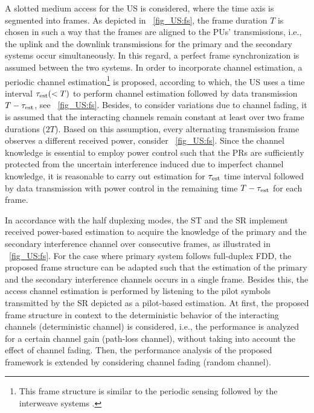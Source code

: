 A slotted medium access for the US is considered, where the time axis is segmented into frames. As depicted in \figurename~\ref{fig_US:fs}, the frame duration $T$ is chosen in such a way that the frames are aligned to the PUs' transmissions, i.e., the uplink and the downlink transmissions for the primary and the secondary systems occur simultaneously. In this regard, a perfect frame synchronization is assumed between the two systems. In order to incorporate channel estimation, a periodic channel estimation\footnote{This frame structure is similar to the periodic sensing followed by the interweave systems \cite{Liang08}.} is proposed, according to which, the US uses a time interval $\tau_{\text{est}} (< T)$ to perform channel estimation followed by data transmission $T- \tau_{\text{est}}$, see \figurename~\ref{fig_US:fs}. Besides, to consider variations due to channel fading, it is assumed that the interacting channels remain constant at least over two frame durations ($2T$). Based on this assumption, every alternating transmission frame observes a different received power, consider \figurename~\ref{fig_US:fs}. Since the channel knowledge is essential to employ power control such that the PRs are sufficiently protected from the uncertain interference induced due to imperfect channel knowledge, it is reasonable to carry out estimation for $\tau_{\text{est}}$ time interval followed by data transmission with power control in the remaining time $T - \tau_{\text{est}}$ for each frame. %

In accordance with the half duplexing modes, the ST and the SR implement received power-based estimation to acquire the knowledge of the primary and the secondary interference channel over consecutive frames, as illustrated in \figurename~\ref{fig_US:fs}. For the case where primary system follows full-duplex FDD, the proposed frame structure can be adapted such that the estimation of the primary and the secondary interference channels occurs in a single frame. Besides this, the access channel estimation is performed by listening to the pilot symbols transmitted by the SR depicted as a pilot-based estimation. 
At first, the proposed frame structure in context to the deterministic behavior of the interacting channels (deterministic channel) is considered, i.e., the performance is analyzed for a certain channel gain (path-loss channel), without taking into account the effect of channel fading. Then, the performance analysis of the proposed framework is extended by considering channel fading (random channel). %



